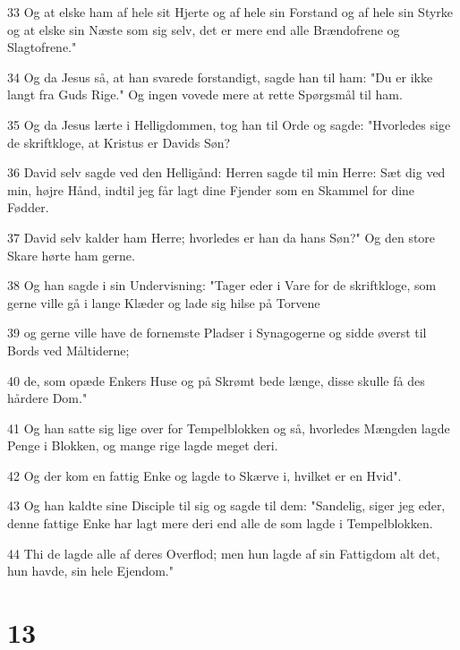 \par 33 Og at elske ham af hele sit Hjerte og af hele sin Forstand og af hele sin Styrke og at elske sin Næste som sig selv, det er mere end alle Brændofrene og Slagtofrene."
\par 34 Og da Jesus så, at han svarede forstandigt, sagde han til ham: "Du er ikke langt fra Guds Rige." Og ingen vovede mere at rette Spørgsmål til ham.
\par 35 Og da Jesus lærte i Helligdommen, tog han til Orde og sagde: "Hvorledes sige de skriftkloge, at Kristus er Davids Søn?
\par 36 David selv sagde ved den Helligånd: Herren sagde til min Herre: Sæt dig ved min, højre Hånd, indtil jeg får lagt dine Fjender som en Skammel for dine Fødder.
\par 37 David selv kalder ham Herre; hvorledes er han da hans Søn?" Og den store Skare hørte ham gerne.
\par 38 Og han sagde i sin Undervisning: "Tager eder i Vare for de skriftkloge, som gerne ville gå i lange Klæder og lade sig hilse på Torvene
\par 39 og gerne ville have de fornemste Pladser i Synagogerne og sidde øverst til Bords ved Måltiderne;
\par 40 de, som opæde Enkers Huse og på Skrømt bede længe, disse skulle få des hårdere Dom."
\par 41 Og han satte sig lige over for Tempelblokken og så, hvorledes Mængden lagde Penge i Blokken, og mange rige lagde meget deri.
\par 42 Og der kom en fattig Enke og lagde to Skærve i, hvilket er en Hvid".
\par 43 Og han kaldte sine Disciple til sig og sagde til dem: "Sandelig, siger jeg eder, denne fattige Enke har lagt mere deri end alle de som lagde i Tempelblokken.
\par 44 Thi de lagde alle af deres Overflod; men hun lagde af sin Fattigdom alt det, hun havde, sin hele Ejendom."

\chapter{13}

